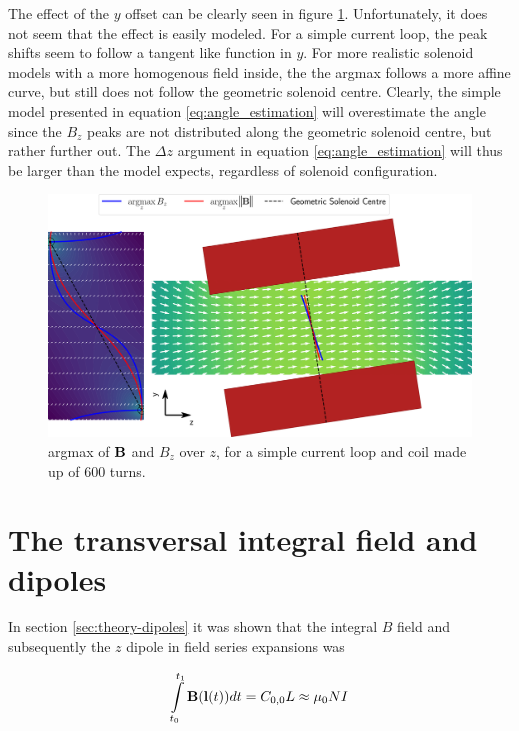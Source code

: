 The effect of the $y$ offset can be clearly seen in figure
\ref{fig:sim-mag-fieldmap-argmax}. Unfortunately, it does not seem
that the effect is easily modeled. For a simple current loop, the peak
shifts seem to follow a tangent like function in $y$.
For more realistic solenoid models with a more homogenous
field inside, the the argmax follows a more affine curve,
but still does not follow the geometric solenoid centre.
Clearly, the simple model
presented in equation \ref{eq:angle_estimation} will overestimate
the angle since the $B_z$ peaks are not distributed along the geometric
solenoid centre, but rather further out. The $\Delta z$ argument in
equation \ref{eq:angle_estimation} will thus be larger than the model
expects, regardless of solenoid configuration.


\begin{figure}[h!]
    \centering
    \includegraphics[width=\linewidth]{figs/sim-fieldmap}
    \caption{argmax of $\vb{B}$ and $B_z$  over $z$, for a simple current
        loop and coil made up of 600 turns.}
    \label{fig:sim-mag-fieldmap-argmax}
\end{figure}

\section{The transversal integral field and dipoles}
\label{sec:dipole-simulations}
In section \ref{sec:theory-dipoles} it was shown that the integral
$B$ field and subsequently the $z$ dipole in field
series expansions was


\begin{equation}
    \int \limits_{t_0}^{t_1} \vb{B}(\vb{l}(t))dt = C_{0,0}L \approx \mu_0 NI
    \label{eq:Bzlineint}
\end{equation}

